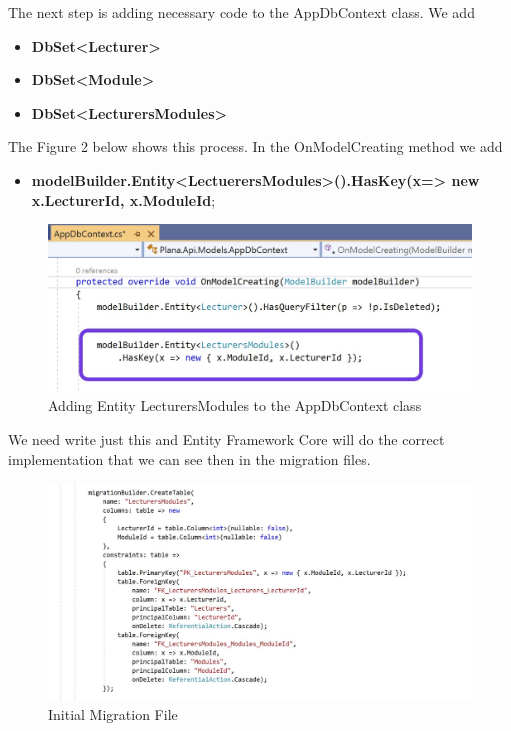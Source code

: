 \documentclass{scrartcl}
\begin{document}
 The next step  is adding necessary code to the AppDbContext class. We add 
 \begin{itemize}
 \item \textbf{DbSet<Lecturer>} 
 \item \textbf {DbSet<Module>}
 \item \textbf{DbSet<LecturersModules>}
 \end{itemize}
 
 
 
The Figure 2 below shows this process. In the OnModelCreating method we add
\begin{itemize}
\item\textbf{modelBuilder.Entity<LectuerersModules>().HasKey(x=> new {x.LecturerId, x.ModuleId}};
\end{itemize}


 





\begin{figure}[H]
\centering
\includegraphics[width=150mm]{report_img/many-to-many.JPG}
\caption{Adding Entity LecturersModules to the AppDbContext class}
\label{blabla}
\end{figure}  
We need write just this and Entity Framework Core will do the correct implementation that we can see then in the migration files. \cite{patrick}

\begin{figure}[H]
\centering
\includegraphics[width=150mm]{report_img/Initial.JPG}
\caption{Initial Migration File}
\label{blabla}
\end{figure} 
\end{document}
